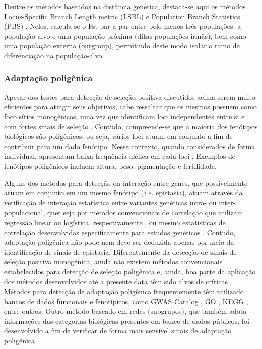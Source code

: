 Dentre os métodos baseados na distância genética, destaca-se aqui os métodos Locus-Specific Branch Length metric (LSBL) \cite{shriver_genomic_2004} e Population Branch Statistics (PBS) \cite{yi_sequencing_2010}. Neles, calcula-se o Fst par-a-par entre pelo menos três populações: a população-alvo e uma população próxima (ditas populações-irmãs), bem como uma população externa (outgroup), permitindo deste modo isolar o ramo de diferenciação na população-alvo.

\subsubsection{Adaptação poligênica}

Apesar dos testes para detecção de seleção positiva discutidos acima serem muito eficientes para atingir seus objetivos, cabe ressaltar que os mesmos possuem como foco sítios monogênicos, uma vez que identificam loci independentes entre si e com fortes sinais de seleção \cite{pritchard_adaptation_2010}. Contudo, compreende-se que a maioria dos fenótipos biológicos são poligênicos, ou seja, vários loci atuam em conjunto a fim de contribuir para um dado fenótipo. Nesse contexto, quando considerados de forma individual, apresentam baixa frequência alélica em cada loci \cite{pritchard_genetics_2010,visscher_10_2017}. Exemplos de fenótipos poligênicos incluem altura, peso, pigmentação e fertilidade.

Alguns dos métodos para detecção da interação entre genes, que possivelmente atuam em conjunto em um mesmo fenótipo (\emph{i.e.} epistasia), atuam através da verificação de interação estatística entre variantes genéticas intra- ou inter-populacional, quer seja por métodos convencionais de correlação que utilizam regressão linear ou logística, respectivamente \cite{wan_boost_2010,ueki_improved_2012}, ou mesmo estatísticas de correlação desenvolvidas especificamente para estudos genéticos \cite{climer_custom_2014,climer_allele-specific_2014}. Contudo, adaptação poligênica não pode nem deve ser deduzida apenas por meio da identificação de sinais de epistasia. Diferentemente da detecção de sinais de seleção positiva monogênica, ainda não existem métodos convencionais estabelecidos para detecção de seleção poligênica \cite{pritchard_genetics_2010} e, ainda, boa parte da aplicação dos métodos desenvolvidos até a presente data têm sido alvos de críticas \cite{sohail_polygenic_2019,refoyo-martinez_how_2020}. 
Métodos para detecção de adaptação poligênica frequentemente têm utilizado bancos de dados funcionais e fenotípicos, como GWAS Catalog \cite{buniello_nhgri-ebi_2019}, GO \cite{ashburner_gene_2000,thegeneontologyconsortium_gene_2019}, KEGG \cite{kanehisa_kegg_2000,kanehisa_new_2019}, entre outros. Outro método baseado em redes (subgrupos), que também adota informações das categorias biológicas presentes em banco de dados públicos, foi desenvolvido a fim de verificar de forma mais sensível sinais de adaptação poligênica \cite{gouy_detecting_2017}. 

